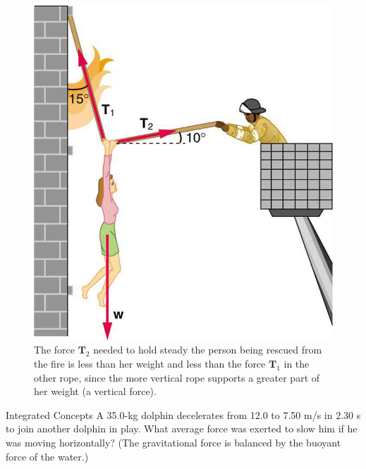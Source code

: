 \documentclass[
]{book}
\newenvironment{problems-exercises}{}{}
\newenvironment{tinysection}{}{}
\begin{document}
\begin{problems-exercises}
\begin{figure}
\hypertarget{import-auto-id2677556}{%
\centering
\includegraphics{images/Figure 04_07_08.jpg}
\caption{The force \(\textbf{T}_{2}{}\) needed to hold steady the person being
rescued from the fire is less than her weight and less than the force
\(\textbf{T}_{1}{}\)\textbf{} in the other rope,
since the more vertical rope supports a greater part of her weight (a
vertical force).}\label{import-auto-id2677556}
}
\end{figure}

\hypertarget{fs-id1486506}{}
\hypertarget{fs-id3036356}{}
\begin{tinysection}

{Integrated Concepts} A 35.0-kg dolphin decelerates
from 12.0 to 7.50 m/s in 2.30 s to join another dolphin in play. What
average force was exerted to slow him if he was moving horizontally?
(The gravitational force is balanced by the buoyant force of the water.)

\end{tinysection}

\hypertarget{fs-id3078491}{}
\hypertarget{fs-id1614205}{}
\begin{tinysection}


\end{tinysection}
\end{problems-exercises}
\end{document}
